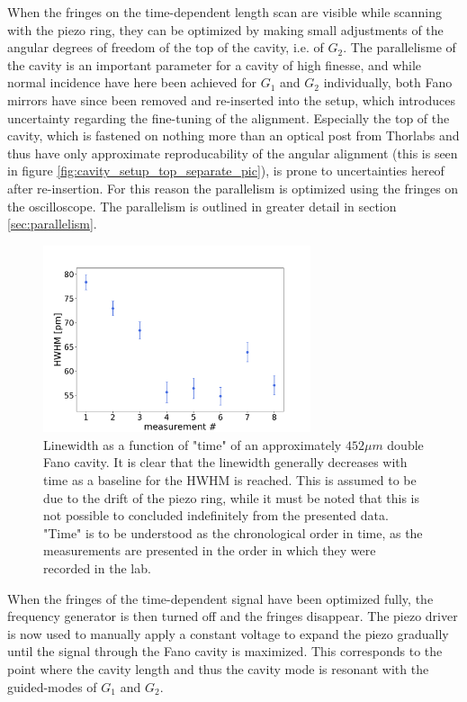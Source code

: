 When the fringes on the time-dependent length scan are visible while scanning with the piezo ring, they can be optimized by making small adjustments of the angular degrees of freedom of the top of the cavity, i.e. of $G_2$. The parallelisme of the cavity is an important parameter for a cavity of high finesse, and while normal incidence have here been achieved for $G_1$ and $G_2$ individually, both Fano mirrors have since been removed and re-inserted into the setup, which introduces uncertainty regarding the fine-tuning of the alignment. Especially the top of the cavity, which is fastened on nothing more than an optical post from Thorlabs and thus have only approximate reproducability of the angular alignment (this is seen in figure \ref{fig:cavity_setup_top_separate_pic}), is prone to uncertainties hereof after re-insertion. For this reason the parallelism is optimized using the fringes on the oscilloscope. The parallelism is outlined in greater detail in section \ref{sec:parallelism}.

\begin{figure}[h!]
    \centering
    \includegraphics[width=0.7\textwidth]{figures/HWHM_vs_time_20250266_452um.pdf}
    \caption{Linewidth as a function of "time" of an approximately $452 \mu m$ double Fano cavity. It is clear that the linewidth generally decreases with time as a baseline for the HWHM is reached. This is assumed to be due to the drift of the piezo ring, while it must be noted that this is not possible to concluded indefinitely from the presented data. "Time" is to be understood as the chronological order in time, as the measurements are presented in the order in which they were recorded in the lab.}
    \label{fig:HWHM_vs_time}
\end{figure}

When the fringes of the time-dependent signal have been optimized fully, the frequency generator is then turned off and the fringes disappear. The piezo driver is now used to manually apply a constant voltage to expand the piezo gradually until the signal through the Fano cavity is maximized. This corresponds to the point where the cavity length and thus the cavity mode is resonant with the guided-modes of $G_1$ and $G_2$.

